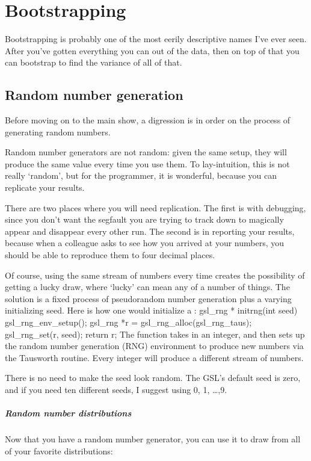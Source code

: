 \chapter{Bootstrapping} \label{boot}

Bootstrapping is probably one of the most eerily descriptive names I've ever seen. 
After you've gotten everything you can out of
the data, then on top of that you can bootstrap to find the variance of all of that.

\section{Random number generation}\label{randomnumbers}
Before moving on to the main show, a digression is in order on the
process of generating random numbers. 

Random number generators are not random: given the same setup, they
will produce the same value every time you use them. To lay-intuition,
this is not really `random', but for the programmer, it is wonderful,
because you can replicate your results.

There are two places where you will need replication. The first is with
debugging, since you don't want the segfault you are trying to track
down to magically appear and disappear every other run. The second is
in reporting your results, because when a colleague asks to see how you
arrived at your numbers, you should be able to reproduce them to four
decimal places.

Of course, using the same stream of numbers every time creates the
possibility of getting a lucky draw, where `lucky' can mean any of a
number of things. The solution is a fixed process of pseudorandom
number generation plus a varying initializing seed. Here is how one
would initialize a :
gsl_rng * initrng(int seed){
    gsl_rng_env_setup();
    gsl_rng *r  = gsl_rng_alloc(gsl_rng_taus);
    gsl_rng_set(r, seed);  
    return r;
}
The function takes in an integer, and then sets up the random number
generation (RNG) environment to produce new numbers via the Tausworth
routine. Every integer will produce a different stream of numbers.

There is no need to make the seed look random. The GSL's default seed is
zero, and if you need ten different seeds, I suggest using 0, 1, \dots ,9.

\paragraph{Random number distributions}
Now that you have a random number generator, you can use it to draw from all of your favorite distributions:
  
 


